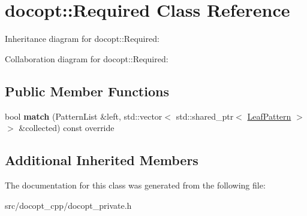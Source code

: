 \hypertarget{classdocopt_1_1Required}{}\section{docopt\+:\+:Required Class Reference}
\label{classdocopt_1_1Required}


Inheritance diagram for docopt\+:\+:Required\+:


Collaboration diagram for docopt\+:\+:Required\+:
\subsection*{Public Member Functions}
\begin{DoxyCompactItemize}
\item 
\mbox{\label{classdocopt_1_1Required_a83b4fcb821eebe551d5fdf3ff9703c97}} 
bool {\bfseries match} (Pattern\+List \&left, std\+::vector$<$ std\+::shared\+\_\+ptr$<$ \hyperlink{classdocopt_1_1LeafPattern}{Leaf\+Pattern} $>$$>$ \&collected) const override
\end{DoxyCompactItemize}
\subsection*{Additional Inherited Members}


The documentation for this class was generated from the following file\+:\begin{DoxyCompactItemize}
\item 
src/docopt\+\_\+cpp/docopt\+\_\+private.\+h\end{DoxyCompactItemize}
